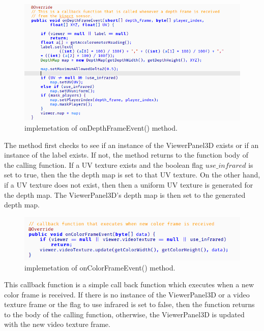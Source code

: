 \documentclass[a4paper, 12pt]{article}
\begin{document}
\begin{figure}[!htb]
	\begin{center}
  \includegraphics[scale=0.75]{codesnippet6.png}
  	\caption{implemetation of onDepthFrameEvent() method.}
  \end{center} 
  \label{fig: codesnippet5} 
\end{figure}

The method first checks to see if an instance of the ViewerPanel3D exists or if an instance of the label exists. If not, the method returns to the function body of the calling function. If a UV texture exists and the boolean flag $use\_infrared$ is set to true, then the the depth map is set to that UV texture. On the other hand, if a UV texture does not exist, then then a uniform UV texture is generated for the depth map. The ViewerPanel3D's depth map is then set to the generated depth map. 

\begin{figure}[!htb]
	\begin{center}
  \includegraphics[scale=0.75]{codesnippet7.png}
  	\caption{implemetation of onColorFrameEvent() method.}
  \end{center} 
  \label{fig: codesnippet6} 
\end{figure}

This callback function is a simple call back function which executes when a new color frame is received. If there is no instance of the ViewerPanel3D or a video texture frame or the flag to use infrared is set to false, then the function returns to the body of the calling function, otherwise, the ViewerPanel3D is updated with the new video texture frame.
\end{document}
